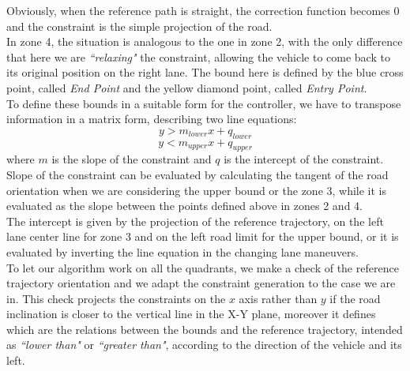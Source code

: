 Obviously, when the reference path is straight, the correction function becomes 0 and the constraint is the simple projection of the road.\\
In zone 4, the situation is analogous to the one in zone 2, with the only difference that here we are \textit{``relaxing"} the constraint, allowing the vehicle to come back to its original position on the right lane. The bound here is defined by the blue cross point, called \textit{End Point} and the yellow diamond point, called \textit{Entry Point}.\\
To define these bounds in a suitable form for the controller, we have to transpose information in a matrix form, describing two line equations:
\begin{equation}
    y > m_{lower}x + q_{lower}
\end{equation}
\begin{equation}
    y < m_{upper}x + q_{upper}
\end{equation}
where $m$ is the slope of the constraint and $q$ is the intercept of the constraint.
Slope of the constraint can be evaluated by calculating the tangent of the road orientation when we are considering the upper bound or the zone 3, while it is evaluated as the slope between the points defined above in zones 2 and 4.\\
The intercept is given by the projection of the reference trajectory, on the left lane center line for zone 3 and on the left road limit for the upper bound, or it is evaluated by inverting the line equation in the changing lane maneuvers.\\
To let our algorithm work on all the quadrants, we make a check of the reference trajectory orientation and we adapt the constraint generation to the case we are in. This check projects the constraints on the $x$ axis rather than $y$ if the road inclination is closer to the vertical line in the X-Y plane, moreover it defines which are the relations between the bounds and the reference trajectory, intended as \textit{``lower than"} or \textit{``greater than"}, according to the direction of the vehicle and its left.
